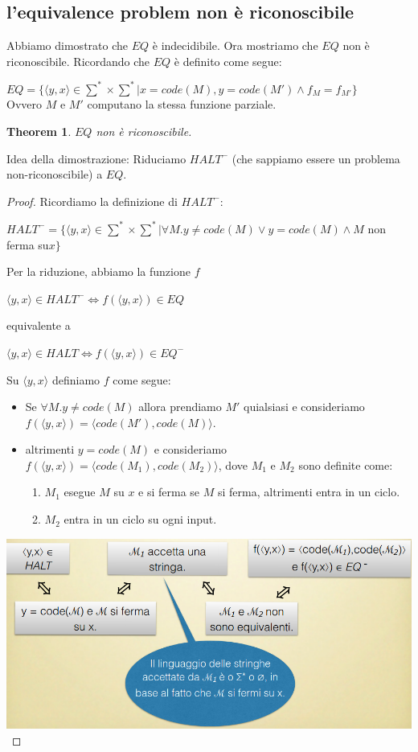 \documentclass[a4paper, 12pt]{article}
\newtheorem{theorem}{Theorem}[section]
\begin{document}
\subsection{l'equivalence problem non \`e riconoscibile}
Abbiamo dimostrato che $EQ$ \`e indecidibile. Ora mostriamo che $EQ$ non \`e riconoscibile. Ricordando che $EQ$ \`e definito come segue:
\begin{center}
$EQ = \{\langle y,x \rangle \in \sum^{*}\times\sum^{*} | x=code(M),y=code(M') \land f_{M} = f_{M'}\}$\\
Ovvero $M$ e $M'$ computano la stessa funzione parziale.
\end{center}
\begin{theorem}
\label{th:7}
$EQ$ non \`e riconoscibile.
\end{theorem}
Idea della dimostrazione: Riduciamo $HALT^{-}$ (che sappiamo essere un problema non-riconoscibile) a $EQ$.
\begin{proof}
Ricordiamo la definizione di $HALT^{-}$:
\begin{center}
$HALT^{-} = \{\langle y,x \rangle \in \sum^{*} \times \sum^{*} | \forall M. y \neq code(M) \lor y=code(M) \land M$ non ferma su$x\}$
\end{center}
Per la riduzione, abbiamo la funzione $f$ \begin{center}
$\langle y, x \rangle \in HALT^{-} \iff f(\langle y,x\rangle) \in EQ$
\end{center}
equivalente a \begin{center}
$\langle y,x \rangle \in HALT \iff f(\langle y,x \rangle) \in EQ^{-}$
\end{center}
Su $\langle y,x\rangle$ definiamo $f$ come segue:
\begin{itemize}
\item Se $\forall M. y \neq code(M)$ allora prendiamo $M'$ quialsiasi e consideriamo \\$f(\langle y, x \rangle) = \langle code(M'), code(M)\rangle$.
\item altrimenti $y = code(M)$ e consideriamo $f(\langle y,x \rangle) = \langle code(M_1), code(M_2) \rangle$, dove $M_1$ e $M_2$ sono definite come:
\begin{enumerate}
\item $M_1$ esegue $M$ su $x$ e si ferma se $M$ si ferma, altrimenti entra in un ciclo.
\item $M_2$ entra in un ciclo su ogni input.\\
\end{enumerate}
\end{itemize}
\includegraphics[scale=0.4]{EQ2.png}\\
\end{proof}
\end{document}
